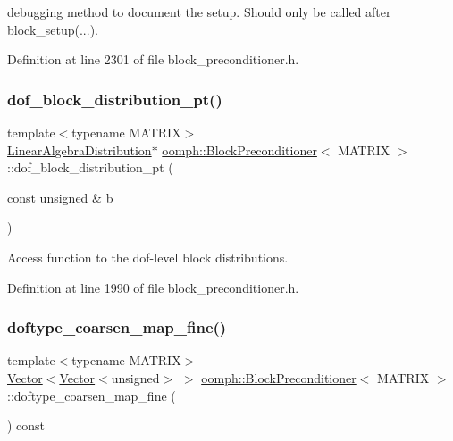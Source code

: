 debugging method to document the setup. Should only be called after block\+\_\+setup(...). 



Definition at line 2301 of file block\+\_\+preconditioner.\+h.

\mbox{\label{classoomph_1_1BlockPreconditioner_a1ee4a9fcf226e8c4438fb25747cb6e93}} 
\subsubsection{\texorpdfstring{dof\+\_\+block\+\_\+distribution\+\_\+pt()}{dof\_block\_distribution\_pt()}}
{\footnotesize\ttfamily template$<$typename M\+A\+T\+R\+IX$>$ \\
\hyperlink{classoomph_1_1LinearAlgebraDistribution}{Linear\+Algebra\+Distribution}$\ast$ \hyperlink{classoomph_1_1BlockPreconditioner}{oomph\+::\+Block\+Preconditioner}$<$ M\+A\+T\+R\+IX $>$\+::dof\+\_\+block\+\_\+distribution\+\_\+pt (\begin{DoxyParamCaption}\item[{const unsigned \&}]{b }\end{DoxyParamCaption})\hspace{0.3cm}{\ttfamily [inline]}}



Access function to the dof-\/level block distributions. 



Definition at line 1990 of file block\+\_\+preconditioner.\+h.

\mbox{\label{classoomph_1_1BlockPreconditioner_a3a39411824a744d4569fe835dec13047}} 
\subsubsection{\texorpdfstring{doftype\+\_\+coarsen\+\_\+map\+\_\+fine()}{doftype\_coarsen\_map\_fine()}}
{\footnotesize\ttfamily template$<$typename M\+A\+T\+R\+IX$>$ \\
\hyperlink{classoomph_1_1Vector}{Vector}$<$\hyperlink{classoomph_1_1Vector}{Vector}$<$unsigned$>$ $>$ \hyperlink{classoomph_1_1BlockPreconditioner}{oomph\+::\+Block\+Preconditioner}$<$ M\+A\+T\+R\+IX $>$\+::doftype\+\_\+coarsen\+\_\+map\+\_\+fine (\begin{DoxyParamCaption}{ }\end{DoxyParamCaption}) const\hspace{0.3cm}{\ttfamily [inline]}}




